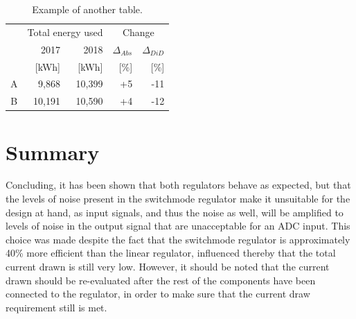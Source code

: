 \begin{table}
         \centering
        \footnotesize
        \caption{Example of another table.}

         \begin{tabular}{c@{\qquad}rrrr}
          \toprule
          \multirow{2}{*}{\raisebox{-\heavyrulewidth}{Schools }} & \multicolumn{2}{c}{Total energy used}& \multicolumn{2}{c}{Change}\\
          \cmidrule{2-5}
            & 2017 & 2018 & $\Delta_{Abs}$ & $\Delta_{DiD}$\\
            & [kWh] & [kWh] & [\%] & [\%] \\
          \midrule
          A & 9,868      & 10,399 & +5 & -11\\
          B & 10,191     & 10,590 & +4 & -12\\
          \bottomrule
        \end{tabular}
     \label{tab:table2}
\end{table}


\section{Summary}\label{sec:temp_summary}
Concluding, it has been shown that both regulators behave as expected, but that the levels of noise present in the switchmode regulator make it unsuitable for the design at hand, as input signals, and thus the noise as well, will be amplified to levels of noise in the output signal that are unacceptable for an ADC input. This choice was made despite the fact that the switchmode regulator is approximately 40\% more efficient than the linear regulator, influenced thereby that the total current drawn is still very low. However, it should be noted that the current drawn should be re-evaluated after the rest of the components have been connected to the regulator, in order to make sure that the current draw requirement still is met.


